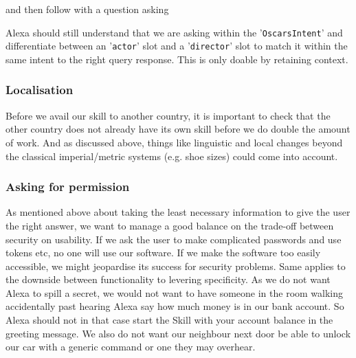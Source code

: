 \begin{flushright}
\end{flushright}
\noindent and then follow with a question asking




\noindent Alexa should still understand that we are asking within the '\texttt{OscarsIntent}' and differentiate between an '\texttt{actor}' slot and a '\texttt{director}' slot to match it within the same intent to the right query response.
This is only doable by retaining context.


\subsubsection*{Localisation}
Before we avail our skill to another country, it is important to check that the other country does not already have its own skill before we do double the amount of work. And as discussed above, things like linguistic and local changes beyond the classical imperial/metric systems (e.g. shoe sizes) could come into account.

\subsubsection*{Asking for permission}
As mentioned above about taking the least necessary information to give the user the right answer, we want to manage a good balance on the trade-off between security on usability. If we ask the user to make complicated passwords and use tokens etc, no one will use our software. If we make the software too easily accessible, we might jeopardise its success for security problems. Same applies to the downside between functionality to levering specificity. As we do not want Alexa to spill a secret, we would not want to have someone in the room walking accidentally past hearing Alexa say how much money is in our bank account. So Alexa should not in that case start the Skill with your account balance in the greeting message. We also do not want our neighbour next door be able to unlock our car with a generic command or one they may overhear.

